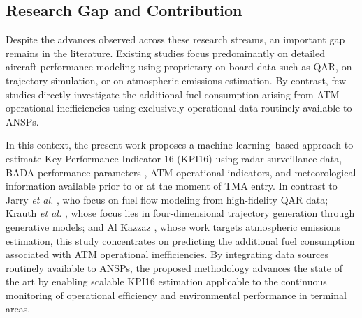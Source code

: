\subsection{Research Gap and Contribution}
Despite the advances observed across these research streams, an important gap remains in the literature. Existing studies focus predominantly on detailed aircraft performance modeling using proprietary on-board data such as QAR, on trajectory simulation, or on atmospheric emissions estimation. By contrast, few studies directly investigate the additional fuel consumption arising from ATM operational inefficiencies using exclusively operational data routinely available to ANSPs.

In this context, the present work proposes a machine learning–based approach to estimate Key Performance Indicator 16 (KPI16) using radar surveillance data, BADA performance parameters \cite{nuic2010bada}, ATM operational indicators, and meteorological information available prior to or at the moment of TMA entry. In contrast to Jarry \textit{et al.} \cite{jarry2024generalization, jarry2025ageing}, who focus on fuel flow modeling from high-fidelity QAR data; Krauth \textit{et al.} \cite{krauth2023generative}, whose focus lies in four-dimensional trajectory generation through generative models; and Al Kazzaz \cite{alkazzaz2025emissions}, whose work targets atmospheric emissions estimation, this study concentrates on predicting the additional fuel consumption associated with ATM operational inefficiencies. By integrating data sources routinely available to ANSPs, the proposed methodology advances the state of the art by enabling scalable KPI16 estimation applicable to the continuous monitoring of operational efficiency and environmental performance in terminal areas.
